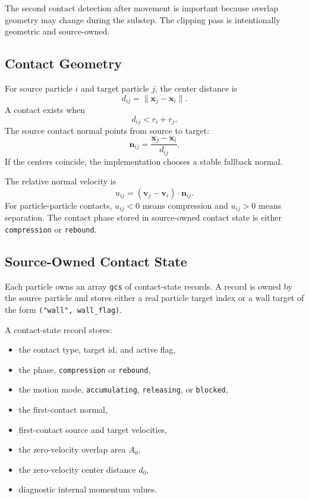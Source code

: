 The second contact detection after movement is important because overlap
geometry may change during the substep.  The clipping pass is intentionally
geometric and source-owned.

\subsection{Contact Geometry}

For source particle \(i\) and target particle \(j\), the center distance is
\[
    d_{ij} = \lVert \mathbf{x}_j - \mathbf{x}_i \rVert .
\]
A contact exists when
\[
    d_{ij} < r_i + r_j .
\]
The source contact normal points from source to target:
\[
    \mathbf{n}_{ij}
    =
    \frac{\mathbf{x}_j - \mathbf{x}_i}{d_{ij}} .
\]
If the centers coincide, the implementation chooses a stable fallback normal.

The relative normal velocity is
\[
    u_{ij}
    =
    (\mathbf{v}_j - \mathbf{v}_i) \cdot \mathbf{n}_{ij}.
\]
For particle-particle contacts, \(u_{ij}<0\) means compression and
\(u_{ij}>0\) means separation.  The contact phase stored in source-owned
contact state is either \texttt{compression} or \texttt{rebound}.

\subsection{Source-Owned Contact State}

Each particle owns an array \texttt{gcs} of contact-state records.  A record is
owned by the source particle and stores either a real particle target index or a
wall target of the form \texttt{("wall", wall\_flag)}.

A contact-state record stores:
\begin{itemize}
    \item the contact type, target id, and active flag,
    \item the phase, \texttt{compression} or \texttt{rebound},
    \item the motion mode, \texttt{accumulating}, \texttt{releasing}, or
          \texttt{blocked},
    \item the first-contact normal,
    \item first-contact source and target velocities,
    \item the zero-velocity overlap area \(A_0\),
    \item the zero-velocity center distance \(d_0\),
    \item diagnostic internal momentum values.
\end{itemize}

